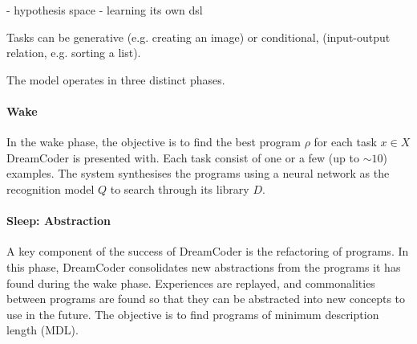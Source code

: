 - hypothesis space
- learning its own dsl

Tasks can be generative (e.g. creating an image) or conditional, (input-output relation, e.g. sorting a list).


The model operates in three distinct phases. 

\paragraph{Wake} In the wake phase, the objective is to find the best program $\rho$  for each task $x \in X$ DreamCoder is presented with. Each task consist of one or a few (up to $\sim10$) examples. The system synthesises the programs using a neural network as the recognition model $Q$ to search through its library $D$.

\paragraph{Sleep: Abstraction} A key component of the success of DreamCoder is the refactoring of programs. In this phase, DreamCoder consolidates new abstractions from the programs it has found during the wake phase. Experiences are replayed, and commonalities between programs are found so that they can be abstracted into new concepts to use in the future. The objective is to find programs of minimum description length (MDL). 

